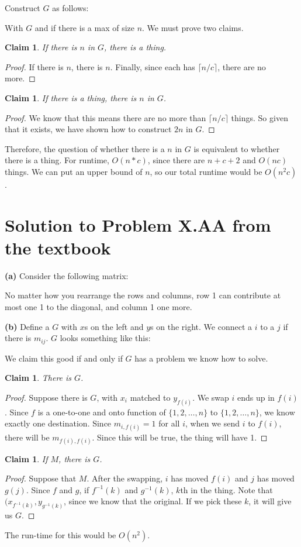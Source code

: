 \documentclass[11pt]{article}
\newtheorem{claim}[theorem]{Claim}
\begin{document}
Construct $G$ as follows:


With $G$ and if there is a max of size $n$. We must prove two claims.
\begin{claim} 
If there is $n$ in $G$, there is a thing. 
\end{claim}
\begin{proof}
If there is $n$, there is $n$. Finally, since each has $\lceil n/c \rceil$, there are no more.
\end{proof}


\begin{claim} 
If there is a thing, there is $n$ in $G$. 
\end{claim}
\begin{proof}
We know that this means there are no more than $\lceil n/c \rceil$ things. So given that it exists, we have shown how to construct $2n$ in $G$.
\end{proof}
Therefore, the question of whether there is a $n$ in $G$ is equivalent to whether there is a thing. For runtime, $O(n*c)$, since there are $n+c+2$ and $O(nc)$ things. We can put an upper bound of $n$, so our total runtime would be $O(n^{2}c)$.


\section*{Solution to Problem X.AA from the textbook}

\textbf{(a)} Consider the following matrix:


No matter how you rearrange the rows and columns, row 1 can contribute at most one 1 to the diagonal, and column 1 one more.

\textbf{(b)}
Define a $G$ with $x$s on the left and $y$s on the right. We connect a $i$ to a $j$ if there is $m_{ij}$. $G$ looks something like this:


We claim this good if and only if $G$ has a problem we know how to solve.
\begin{claim} 
There is $G$. 
\end{claim}
\begin{proof}
Suppose there is $G$, with $x_{i}$ matched to $y_{f(i)}$. We swap $i$ ends up in $f(i)$. Since $f$ is a one-to-one and onto function of $\{1,2,\ldots,n\}$ to $\{1,2,\ldots,n\}$, we know exactly one destination. Since $m_{i,f(i)} = 1$ for all $i$, when we send $i$ to $f(i)$, there will be $m_{f(i),f(i)}$. Since this will be true, the thing will have 1.
\end{proof}
\begin{claim} 
If $M$, there is $G$. 
\end{claim}
\begin{proof}
Suppose that $M$. After the swapping, $i$ has moved $f(i)$ and $j$ has moved $g(j)$. Since $f$ and $g$, if $f^{-1}(k)$ and $g^{-1}(k)$, $k$th in the thing. Note that $(x_{f^{-1}(k)}, y_{g^{-1}(k)}$, since we know that the original. If we pick these $k$, it will give us $G$. 
\end{proof}

The run-time for this would be $O(n^2)$.
\end{document}
